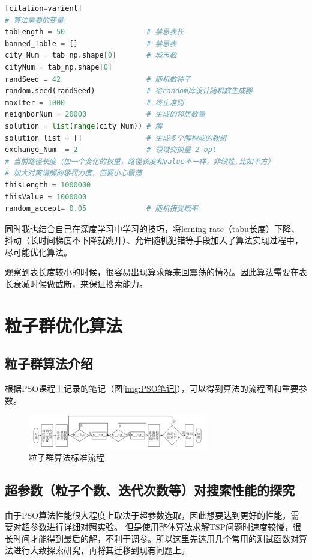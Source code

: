 \documentclass[lang=cn,11pt]{elegantpaper}
\begin{document}
\begin{lstlisting}[language=python][citation=varient]
# 算法需要的变量
tabLength = 50                   # 禁忌表长
banned_Table = []                # 禁忌表
city_Num = tab_np.shape[0]       # 城市数
cityNum = tab_np.shape[0]
randSeed = 42                    # 随机数种子
random.seed(randSeed)            # 给random库设计随机数生成器
maxIter = 1000                   # 终止准则
neighborNum = 20000              # 生成的邻居数量
solution = list(range(city_Num)) # 解
solution_list = []               # 生成多个解构成的数组
exchange_Num  = 2                # 领域交换量 2-opt
# 当前路径长度（加一个变化的权重，路径长度和value不一样，非线性,比如平方）
# 加大对离谱解的惩罚力度，但要小心震荡
thisLength = 1000000
thisValue = 1000000
random_accept= 0.05              # 随机接受概率
\end{lstlisting}


同时我也结合自己在深度学习中学习的技巧，将lerning rate（tabu长度）下降、抖动（长时间梯度不下降就跳开）、允许随机犯错等手段加入了算法实现过程中，尽可能优化算法。

观察到表长度较小的时候，很容易出现算求解来回震荡的情况。因此算法需要在表长衰减时候做截断，来保证搜索能力。

\section{粒子群优化算法}
\subsection{粒子群算法介绍}


根据PSO课程上记录的笔记（图\ref{img:PSO笔记}），可以得到算法的流程图和重要参数。
\begin{figure}[h]
  \centering
  \includegraphics[width=0.7\textwidth]{figure/PSO/粒子群算法标准流程.png} %
  \caption{粒子群算法标准流程} %
  \label{img:粒子群算法标准流程}
\end{figure}
\subsection{超参数（粒子个数、迭代次数等）对搜索性能的探究}
由于PSO算法性能很大程度上取决于超参数选取，因此想要达到更好的性能，需要对超参数进行详细对照实验。
但是使用整体算法求解TSP问题时速度较慢，很长时间才能得到最后的解，不利于调参。所以这里先选用几个常用的测试函数对算法进行大致探索研究，再将其迁移到现有问题上。
\end{document}
